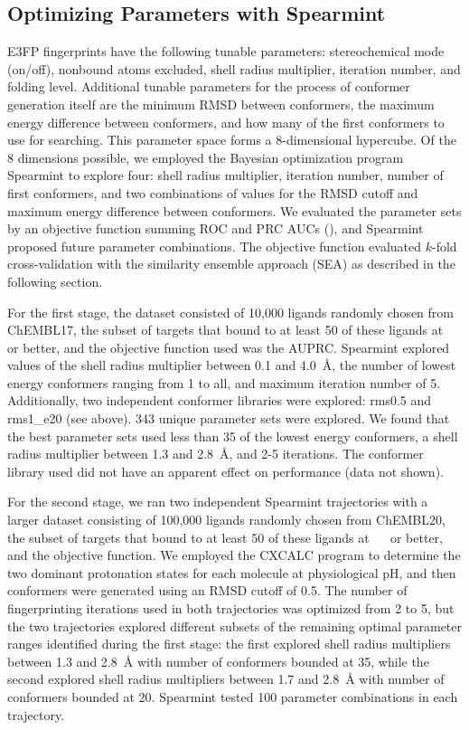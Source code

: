 \documentclass[../main.tex]{subfiles}
\begin{document}
\begin{refsection}
\subsection*{Optimizing Parameters with Spearmint}

E3FP fingerprints have the following tunable parameters: stereochemical mode (on/off), nonbound atoms excluded, shell radius multiplier, iteration number, and folding level.
Additional tunable parameters for the process of conformer generation itself are the minimum RMSD between conformers, the maximum energy difference between conformers, and how many of the first conformers to use for searching.
This parameter space forms a 8-dimensional hypercube.
Of the 8 dimensions possible, we employed the Bayesian optimization program Spearmint  \cite{snoek_2012} to explore four: shell radius multiplier, iteration number, number of first conformers, and two combinations of values for the RMSD cutoff and maximum energy difference between conformers.
We evaluated the parameter sets by an objective function summing ROC and PRC AUCs (\AUCsum{}), and Spearmint proposed future parameter combinations.
The objective function evaluated $k$-fold cross-validation with the similarity ensemble approach (SEA) as described in the following section.

For the first stage, the dataset consisted of 10,000 ligands randomly chosen from ChEMBL17, the subset of targets that bound to at least 50 of these ligands at \SI{}{\micro\molar} or better, and the objective function used was the AUPRC.
Spearmint explored values of the shell radius multiplier between 0.1 and \SI{4.0}{\angstrom}, the number of lowest energy conformers ranging from 1 to all, and maximum iteration number of 5.
Additionally, two independent conformer libraries were explored: rms0.5 and rms1\_e20 (see above).
343 unique parameter sets were explored.
We found that the best parameter sets used less than 35 of the lowest energy conformers, a shell radius multiplier between 1.3 and \SI{2.8}{\angstrom}, and 2-5 iterations.
The conformer library used did not have an apparent effect on performance  (data not shown).

For the second stage, we ran two independent Spearmint trajectories with a larger dataset consisting of 100,000 ligands randomly chosen from ChEMBL20, the subset of targets that bound to at least 50 of these ligands at \SI{}{\micro\molar} or better, and the \AUCsum{} objective function.
We employed the CXCALC program \cite{chemaxon_software_2015} to determine the two dominant protonation states for each molecule at physiological pH, and then conformers were generated using an RMSD cutoff of 0.5.
The number of fingerprinting iterations used in both trajectories was optimized from 2 to 5, but the two trajectories explored different subsets of the remaining optimal parameter ranges identified during the first stage: the first explored shell radius multipliers between 1.3 and \SI{2.8}{\angstrom} with number of conformers bounded at 35, while the second explored shell radius multipliers between 1.7 and  \SI{2.8}{\angstrom} with number of conformers bounded at 20.
Spearmint tested 100 parameter combinations in each trajectory.


\end{refsection}
\end{document}
